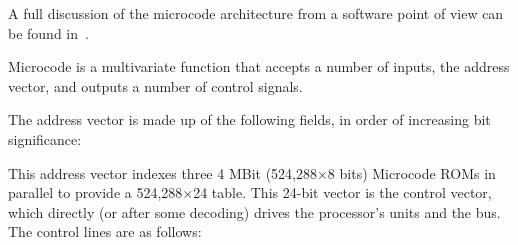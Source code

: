 A full discussion of the microcode architecture from a software point of
view can be found in~.

Microcode is a multivariate function that accepts a number of inputs, the
address vector, and outputs a number of control signals. 

The address vector is made up of the following fields, in order of increasing
bit significance:



This address vector indexes three 4 MBit (524,288×8 bits) Microcode ROMs in
parallel to provide a 524,288×24 table. This 24-bit vector is the control
vector, which directly (or after some decoding) drives the processor's units
and the bus. The control lines are as follows:







